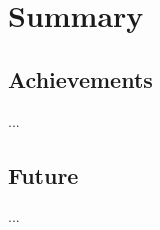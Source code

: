 \chapter{Summary}
\label{cha:summary}

	
	
	\section{Achievements}
	\label{sec:sum-reached}
		...
	
	\section{Future}
	\label{sec:sum-future}
		...
	
	
	